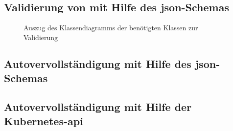 \subsection{Validierung von mit Hilfe des \acs{json}-Schemas}

\begin{figure}[htp] %
      \centering
      \caption{Auszug des Klassendiagramms der benötigten Klassen zur Validierung}
      \label{fig:class-diagram-yaml-language-service-validation}
\end{figure}

\subsection{Autovervollständigung mit Hilfe des \acs{json}-Schemas}

\subsection{Autovervollständigung mit Hilfe der Kubernetes-\acs{api}}

